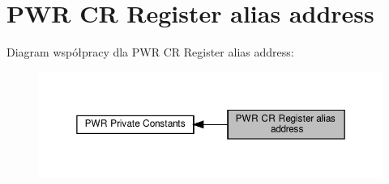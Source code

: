 \hypertarget{group___p_w_r___c_r__register__alias}{}\section{P\+WR CR Register alias address}
\label{group___p_w_r___c_r__register__alias}
Diagram współpracy dla P\+WR CR Register alias address\+:\nopagebreak
\begin{figure}[H]
\begin{center}
\leavevmode
\includegraphics[width=350pt]{group___p_w_r___c_r__register__alias}
\end{center}
\end{figure}
